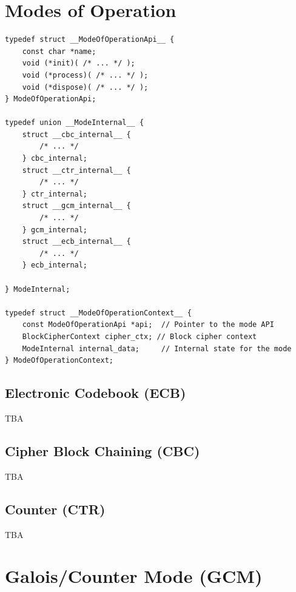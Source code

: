 \documentclass[11pt,a4paper]{report}
\theoremstyle{definitionstyle}
\begin{document}
\newpage
\section{Modes of Operation}

\begin{lstlisting}[style=cstyle]
typedef struct __ModeOfOperationApi__ {
	const char *name;
	void (*init)( /* ... */ );
	void (*process)( /* ... */ );
	void (*dispose)( /* ... */ );
} ModeOfOperationApi;

typedef union __ModeInternal__ {
	struct __cbc_internal__ {
		/* ... */
	} cbc_internal;
	struct __ctr_internal__ {
		/* ... */
	} ctr_internal;
	struct __gcm_internal__ {
		/* ... */
	} gcm_internal;
	struct __ecb_internal__ {
		/* ... */
	} ecb_internal;
	
} ModeInternal;

typedef struct __ModeOfOperationContext__ {
	const ModeOfOperationApi *api;  // Pointer to the mode API
	BlockCipherContext cipher_ctx; // Block cipher context
	ModeInternal internal_data;     // Internal state for the mode
} ModeOfOperationContext;
\end{lstlisting}
%	

\subsection{Electronic Codebook (ECB)}
TBA
\subsection{Cipher Block Chaining (CBC)}
TBA
\subsection{Counter (CTR)}
TBA
\newpage
\section{Galois\;/\;Counter Mode (GCM)}


\newpage
\end{document}
